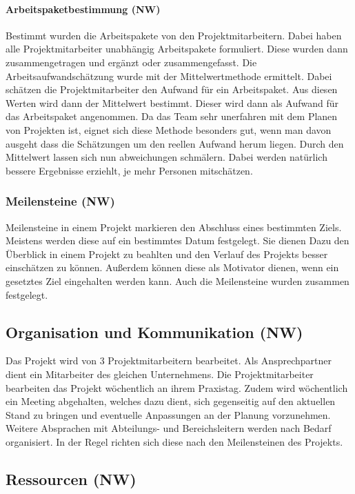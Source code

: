 \documentclass[ThesisDJ.tex]{subfiles}
\begin{document}
\paragraph{Arbeitspaketbestimmung (NW)}
Bestimmt wurden die Arbeitspakete von den Projektmitarbeitern. Dabei haben alle Projektmitarbeiter unabhängig Arbeitspakete 
formuliert. Diese wurden dann zusammengetragen und ergänzt oder zusammengefasst.
Die Arbeitsaufwandschätzung wurde mit der Mittelwertmethode ermittelt. Dabei schätzen die Projektmitarbeiter den Aufwand für ein 
Arbeitspaket. Aus diesen Werten wird dann der Mittelwert bestimmt. Dieser wird dann als Aufwand für das Arbeitspaket angenommen. 
Da das Team sehr unerfahren mit dem Planen von Projekten ist, eignet sich diese Methode besonders gut, wenn man davon ausgeht 
dass die Schätzungen um den reellen Aufwand herum liegen. Durch den Mittelwert lassen sich nun abweichungen schmälern. Dabei 
werden natürlich bessere Ergebnisse erziehlt, je mehr Personen mitschätzen. 

\subsubsection{Meilensteine (NW)}
Meilensteine in einem Projekt markieren den Abschluss eines bestimmten Ziels. Meistens werden diese auf ein bestimmtes Datum festgelegt.
Sie dienen Dazu den Überblick in einem Projekt zu beahlten und den Verlauf des Projekts besser einschätzen zu können. 
Außerdem können diese als Motivator dienen, wenn ein gesetztes Ziel eingehalten werden kann. 
Auch die Meilensteine wurden zusammen festgelegt.


\subsection{Organisation und Kommunikation (NW)}
Das Projekt wird von 3 Projektmitarbeitern bearbeitet. Als Ansprechpartner dient ein Mitarbeiter des gleichen Unternehmens. Die Projektmitarbeiter bearbeiten das Projekt wöchentlich an ihrem Praxistag. Zudem wird wöchentlich ein Meeting abgehalten, welches dazu dient, sich gegenseitig auf den aktuellen Stand zu bringen und eventuelle Anpassungen an der Planung vorzunehmen. Weitere Absprachen mit Abteilungs- und Bereichsleitern werden nach Bedarf organisiert. In der Regel richten sich diese nach den Meilensteinen des Projekts.  

\subsection{Ressourcen (NW)}
\end{document}
